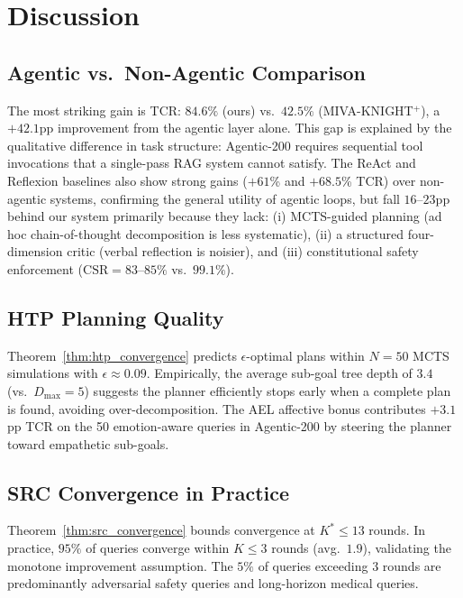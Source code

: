 \documentclass[10pt,conference]{IEEEtran}
\theoremstyle{ieeethm}
\theoremstyle{ieeedef}
\theoremstyle{ieeeremark}
\begin{document}
\section{Discussion}
\label{sec:discussion}

\subsection{Agentic vs.\ Non-Agentic Comparison}

The most striking gain is TCR: $84.6\%$ (ours) vs.\ $42.5\%$ (MIVA-KNIGHT$^+$), a $+42.1$pp improvement from the agentic layer alone. This gap is explained by the qualitative difference in task structure: Agentic-200 requires sequential tool invocations that a single-pass RAG system cannot satisfy. The ReAct and Reflexion baselines also show strong gains ($+61$\% and $+68.5$\% TCR) over non-agentic systems, confirming the general utility of agentic loops, but fall $16$--$23$pp behind our system primarily because they lack: (i) MCTS-guided planning (ad hoc chain-of-thought decomposition is less systematic), (ii) a structured four-dimension critic (verbal reflection is noisier), and (iii) constitutional safety enforcement ($\text{CSR} = 83$--$85\%$ vs.\ $99.1\%$).

\subsection{HTP Planning Quality}

Theorem~\ref{thm:htp_convergence} predicts $\epsilon$-optimal plans within $N = 50$ MCTS simulations with $\epsilon \approx 0.09$. Empirically, the average sub-goal tree depth of $3.4$ (vs.\ $D_\text{max} = 5$) suggests the planner efficiently stops early when a complete plan is found, avoiding over-decomposition. The AEL affective bonus contributes $+3.1$pp TCR on the 50 emotion-aware queries in Agentic-200 by steering the planner toward empathetic sub-goals.

\subsection{SRC Convergence in Practice}

Theorem~\ref{thm:src_convergence} bounds convergence at $K^* \leq 13$ rounds. In practice, $95\%$ of queries converge within $K \leq 3$ rounds (avg.\ $1.9$), validating the monotone improvement assumption. The $5\%$ of queries exceeding $3$ rounds are predominantly adversarial safety queries and long-horizon medical queries.
\end{document}
